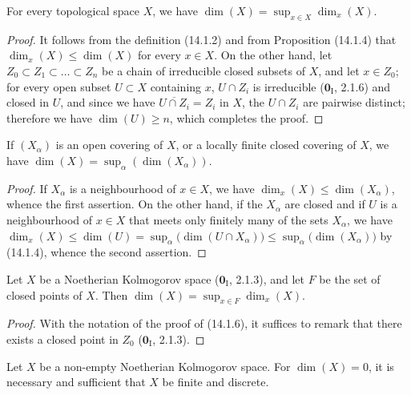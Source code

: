 \begin{proposition}[14.1.6]
\label{0.14.1.6}
For every topological space $X$, we have
$\dim(X)=\sup_{x\in X}\dim_x(X)$.
\end{proposition}

\begin{proof}
It follows from the definition (14.1.2) and from Proposition (14.1.4) that
$\dim_x(X)\leq\dim(X)$ for every $x\in X$. On the other hand, let
$Z_0\subset Z_1\subset\ldots\subset Z_n$ be a chain of irreducible closed
subsets of $X$, and let $x\in Z_0$; for every open subset $U\subset X$
containing $x$, $U\cap Z_i$ is irreducible ($\mathbf{0}_{\mathrm I}$, 2.1.6) and
closed in $U$, and since we have $\overline{U\cap Z_i}=Z_i$ in $X$, the
$U\cap Z_i$ are pairwise distinct; therefore we have $\dim(U)\geq n$, which
completes the proof.
\end{proof}

\begin{corollary}[14.1.7]
\label{0.14.1.7}
If $(X_\alpha)$ is an open covering of $X$, or a locally finite closed
covering of $X$, we have
$\dim(X)=\sup_\alpha(\dim(X_\alpha))$.
\end{corollary}

\begin{proof}
If $X_\alpha$ is a neighbourhood of $x\in X$, we have
$\dim_x(X)\leq\dim(X_\alpha)$, whence the first assertion. On the other hand, if
the $X_\alpha$ are closed and if $U$ is a neighbourhood of $x\in X$ that
meets only finitely many of the sets $X_\alpha$, we have $\dim_x(X)\leq\dim(U)=\sup_\alpha\bigl(\dim(U\cap X_\alpha)\bigr)
\leq\sup_\alpha\bigl(\dim(X_\alpha)\bigr)$
by (14.1.4), whence the second assertion.
\end{proof}

\begin{corollary}[14.1.8]
\label{0.14.1.8}
Let $X$ be a Noetherian Kolmogorov space ($\mathbf{0}_{\mathrm I}$, 2.1.3), and
let $F$ be the set of closed points of $X$. Then
$\dim(X)=\sup_{x\in F}\dim_x(X)$.
\end{corollary}

\begin{proof}
With the notation of the proof of (14.1.6), it suffices to remark
that there exists a closed point in $Z_0$ ($\mathbf{0}_{\mathrm I}$, 2.1.3).
\end{proof}

\begin{proposition}[14.1.9]
\label{0.14.1.9}
Let $X$ be a non-empty Noetherian Kolmogorov space. For
$\dim(X)=0$, it is necessary and sufficient that $X$ be finite and discrete.
\end{proposition}

